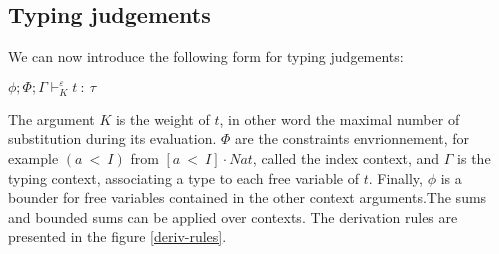\documentclass[a4paper,12pt]{article}
\begin{document}
\subsection{Typing judgements}

We can now introduce the following form for typing judgements:

\begin{center}
  $\phi; \Phi; \Gamma \vdash_{K}^{\varepsilon} t~:~\tau$
\end{center}

The argument $K$ is the weight of $t$, in other word the maximal number of
substitution during its evaluation. $\Phi$ are the constraints envrionnement,
for example $(a~<~I)$ from $[a~<~I] \cdot Nat$, called the index context, and
$\Gamma$ is the typing context, associating a type to each free variable of $t$.
Finally, $\phi$ is a bounder for free variables contained in the other context
arguments.The sums and bounded sums can be applied over contexts. The derivation
rules are presented in the figure \ref{deriv-rules}.
\end{document}
